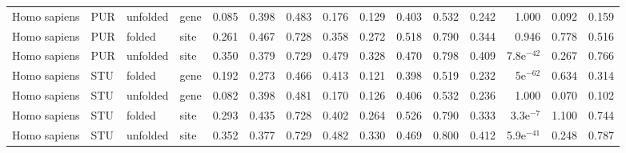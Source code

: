 \begin{longtable}{llllrrrrrrrrrrr}
        Homo sapiens &                       PUR &  unfolded &  gene &                              0.085 &                               0.398 &                 0.483 &                 0.176 &                              0.129 &                               0.403 &                 0.532 &                 0.242 &         1.000 &  0.092 &  0.159 \\
        Homo sapiens &                       PUR &    folded &  site &                              0.261 &                               0.467 &                 0.728 &                 0.358 &                              0.272 &                               0.518 &                 0.790 &                 0.344 &         0.946 &  0.778 &  0.516 \\
        Homo sapiens &                       PUR &  unfolded &  site &                              0.350 &                               0.379 &                 0.729 &                 0.479 &                              0.328 &                               0.470 &                 0.798 &                 0.409 &  7.8e$^{-42}$ &  0.267 &  0.766 \\
        Homo sapiens &                       STU &    folded &  gene &                              0.192 &                               0.273 &                 0.466 &                 0.413 &                              0.121 &                               0.398 &                 0.519 &                 0.232 &    5e$^{-62}$ &  0.634 &  0.314 \\
        Homo sapiens &                       STU &  unfolded &  gene &                              0.082 &                               0.398 &                 0.481 &                 0.170 &                              0.126 &                               0.406 &                 0.532 &                 0.236 &         1.000 &  0.070 &  0.102 \\
        Homo sapiens &                       STU &    folded &  site &                              0.293 &                               0.435 &                 0.728 &                 0.402 &                              0.264 &                               0.526 &                 0.790 &                 0.333 &   3.3e$^{-7}$ &  1.100 &  0.744 \\
        Homo sapiens &                       STU &  unfolded &  site &                              0.352 &                               0.377 &                 0.729 &                 0.482 &                              0.330 &                               0.469 &                 0.800 &                 0.412 &  5.9e$^{-41}$ &  0.248 &  0.787 \\

\end{longtable}

